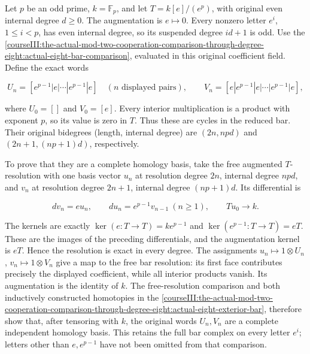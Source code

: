 \label{courseIII:the-original-odd-prime-cooperations-and-degree-six-adams-calculation:section-1}\label{courseIII:odd-coop:1}

Let \(p\) be an odd prime, \(k=\mathbb F_p\), and let \(T=k[e]/(e^p)\), with original even internal degree \(d\geq0\). The augmentation is \(e\mapsto0\). Every nonzero letter \(e^i\), \(1\leq i<p\), has even internal degree, so its suspended degree \(id+1\) is odd. Use the \cref{courseIII:the-actual-mod-two-cooperation-comparison-through-degree-eight:actual-eight-bar-comparison}, evaluated in this original coefficient field. Define the exact words

\[
 U_n=[e^{p-1}|e|\cdots|e^{p-1}|e]\quad(n\text{ displayed pairs}),
 \qquad V_n=[e|e^{p-1}|e|\cdots|e^{p-1}|e],
\]

where \(U_0=[]\) and \(V_0=[e]\). Every interior multiplication is a product with exponent \(p\), so its value is zero in \(T\). Thus these are cycles in the reduced bar. Their original bidegrees (length, internal degree) are \((2n,npd)\) and \((2n+1,(np+1)d)\), respectively.

To prove that they are a complete homology basis, take the free augmented \(T\)-resolution with one basis vector \(u_n\) at resolution degree \(2n\), internal degree \(npd\), and \(v_n\) at resolution degree \(2n+1\), internal degree \((np+1)d\). Its differential is

\[
 d v_n=e u_n,\qquad d u_n=e^{p-1}v_{n-1}\ (n\geq1),
 \qquad Tu_0\longrightarrow k.
\]

The kernels are exactly \(\ker(e:T\to T)=ke^{p-1}\) and \(\ker(e^{p-1}:T\to T)=eT\). These are the images of the preceding differentials, and the augmentation kernel is \(eT\). Hence the resolution is exact in every degree. The assignments \(u_n\mapsto1\otimes U_n\), \(v_n\mapsto1\otimes V_n\) give a map to the free bar resolution: its first face contributes precisely the displayed coefficient, while all interior products vanish. Its augmentation is the identity of \(k\). The free-resolution comparison and both inductively constructed homotopies in the \cref{courseIII:the-actual-mod-two-cooperation-comparison-through-degree-eight:actual-eight-exterior-bar}, therefore show that, after tensoring with \(k\), the original words \(U_n,V_n\) are a complete independent homology basis. This retains the full bar complex on every letter \(e^i\); letters other than \(e,e^{p-1}\) have not been omitted from that comparison.

